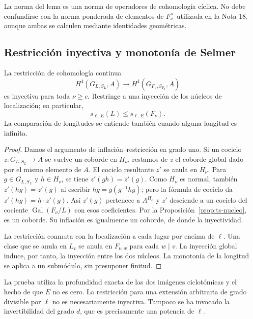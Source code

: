 La norma del lema es una norma de operadores de cohomología cíclica. No debe confundirse con la norma ponderada de elementos de $F_\nu^\times$ utilizada en la Nota 18, aunque ambas se calculen mediante identidades geométricas.

\subsection{Restricción inyectiva y monotonía de Selmer}

\begin{teorema}
\label{thm:ts-restriccion}
La restricción de cohomología continua
\begin{equation}
 H^1(G_{L,S_L},A)\longrightarrow H^1(G_{F_\nu,S_{F_\nu}},A)
 \label{eq:ts-res}
\end{equation}
es inyectiva para toda $\nu\ge c$. Restringe a una inyección de los núcleos de localización; en particular,
\begin{equation}
 s_{\ell,E}(L)\le s_{\ell,E}(F_\nu).
 \label{eq:ts-mono}
\end{equation}
La comparación de longitudes se entiende también cuando alguna longitud es infinita.
\end{teorema}
\begin{proof}
Damos el argumento de inflación--restricción en grado uno. Si un cociclo $z:G_{L,S_L}\to A$ se vuelve un coborde en $H_\nu$, restamos de $z$ el coborde global dado por el mismo elemento de $A$. El cociclo resultante $z'$ se anula en $H_\nu$. Para $g\in G_{L,S_L}$ y $h\in H_\nu$, se tiene $z'(gh)=z'(g)$. Como $H_\nu$ es normal, también $z'(hg)=z'(g)$ al escribir $hg=g(g^{-1}hg)$; pero la fórmula de cociclo da $z'(hg)=h\cdot z'(g)$. Así $z'(g)$ pertenece a $A^{H_\nu}$ y $z'$ desciende a un cociclo del cociente $\operatorname{Gal}(F_\nu/L)$ con esos coeficientes. Por la Proposición~\ref{prop:ts-nucleo}, es un coborde. Su inflación es igualmente un coborde, de donde la inyectividad.

La restricción conmuta con la localización a cada lugar por encima de $\ell$. Una clase que se anula en $L_v$ se anula en $F_{\nu,w}$ para cada $w\mid v$. La inyección global induce, por tanto, la inyección entre los dos núcleos. La monotonía de la longitud se aplica a un submódulo, sin presuponer finitud.
\end{proof}

La prueba utiliza la profundidad exacta de las dos imágenes ciclotómicas y el hecho de que $E$ no es cero. La restricción para una extensión arbitraria de grado divisible por $\ell$ no es necesariamente inyectiva. Tampoco se ha invocado la invertibilidad del grado $d$, que es precisamente una potencia de $\ell$.

